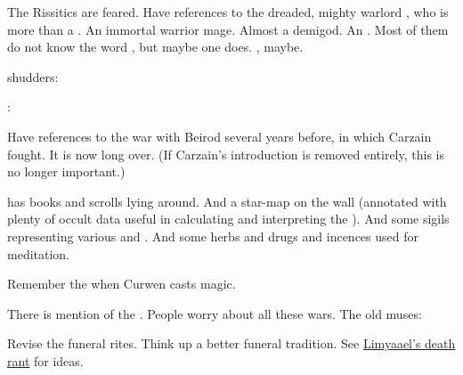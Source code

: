 \begin{garbage}
\begin{changes}
    The Rissitics are feared. 
    Have references to the dreaded, mighty warlord \Narkiza, who is more than a \scatha. 
    An immortal warrior mage. 
    Almost a demigod. 
    An \hs{\Ashenoch}. 
    Most of them do not know the word \quo{\Ashenoch}, but maybe one does. 
    \Sethgal, maybe. 
    
    \Tiroco{} shudders:
    \begin{prose}
      \Tiroco: 
    \end{prose}

    
    Have references to the war with Beirod several years before, in which Carzain fought. 
    It is now long over. 
    (If Carzain's introduction is removed entirely, this is no longer important.)
    
    \Onatol{} has books and scrolls lying around. 
    And a star-map on the wall (annotated with plenty of occult data useful in calculating and interpreting the \matrices). 
    And some sigils representing various \sephiroth{} and \qliphoth. 
    And some herbs and drugs and incences used for meditation. 
    
    Remember the  when Curwen casts magic. 
    
  \begin{comment}
  \paragraph{War is Coming}
  \end{comment}
    There is mention of the . 
    People worry about all these wars. 
    The old \sphyle{} muses: 
  
  \begin{comment}\paragraph{Beyond the Veil}\end{comment}
    Revise the funeral rites. 
    Think up a better funeral tradition. 
    See \href{http://limyaael.livejournal.com/179073.html}{Limyaael's death rant} for ideas. 
    
  \begin{comment}

\end{comment}
\end{changes}
\end{garbage}
